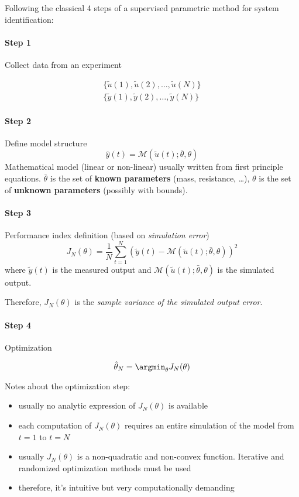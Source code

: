 Following the classical 4 steps of a supervised parametric method for system identification:

\paragraph{Step 1} Collect data from an experiment

\begin{align*}
    \{ \tilde{u}(1), \tilde{u}(2), \dots, \tilde{u}(N) \} \\
    \{ \tilde{y}(1), \tilde{y}(2), \dots, \tilde{y}(N) \}
\end{align*}

\paragraph{Step 2} Define model structure
\[
    \hat{y}(t) = \mathcal{M}(\tilde{u}(t); \bar{\theta}, \theta)
\]
Mathematical model (linear or non-linear) usually written from first principle equations. $\bar{\theta}$ is the set of \textbf{known parameters} (mass, resistance, \dots), $\theta$ is the set of \textbf{unknown parameters} (possibly with bounds).

\paragraph{Step 3} Performance index definition (based on \emph{simulation error})
\[
    J_N(\theta) = \frac{1}{N} \sum_{t=1}^N \left( \tilde{y}(t) - \mathcal{M}(\tilde{u}(t); \bar{\theta}, \theta) \right)^2
\]
where $\tilde{y}(t)$ is the measured output and $\mathcal{M}(\tilde{u}(t); \bar{\theta}, \theta)$ is the simulated output.

Therefore, $J_N(\theta)$ is the \emph{sample variance of the simulated output error}.

\paragraph{Step 4} Optimization

\[
    \hat{\theta}_N = \argmin_\theta J_N(\theta)
\]

Notes about the optimization step:
\begin{itemize}
    \item usually no analytic expression of $J_N(\theta)$ is available
    \item each computation of $J_N(\theta)$ requires an entire simulation of the model from $t=1$ to $t=N$
    \item usually $J_N(\theta)$ is a non-quadratic and non-convex function. Iterative and randomized optimization methods must be used
    \item therefore, it's intuitive but very computationally demanding
\end{itemize}

